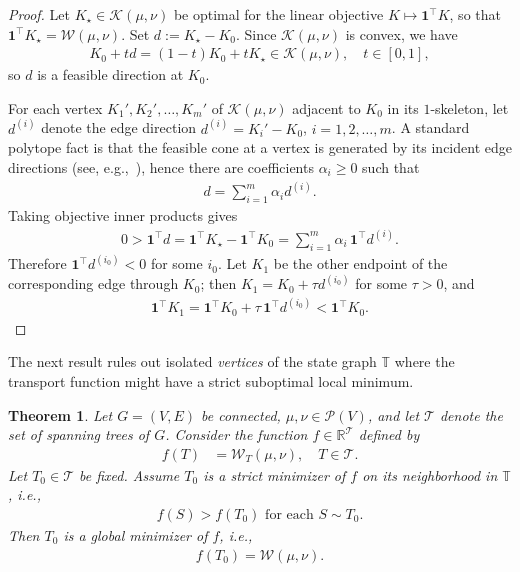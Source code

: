 \documentclass[11pt,a4paper]{article}
\newcommand{\prob}{{\mathscr{P}}}
\newcommand{\wass}{{\mathcal{W}}}
\newcommand{\setoftrees}{{\mathcal{T}}}
\newcommand{\stategraph}{{\mathbb{T}}}
\newcommand{\flowpoly}{{\mathcal{K}}}
\newtheorem{theorem}{Theorem}[section]
\begin{document}
\begin{proof}
    Let $K_\star\in\flowpoly(\mu,\nu)$ be optimal for the linear objective $K\mapsto \mathbf{1}^\top K$, so that $\mathbf{1}^\top K_\star = \wass(\mu,\nu)$. Set $d:=K_\star-K_0$. Since $\flowpoly(\mu,\nu)$ is convex, we have
        \begin{align*}
            K_0+t d = (1-t)K_0+tK_\star \in \flowpoly(\mu,\nu),\quad t\in[0,1],
        \end{align*}
    so $d$ is a feasible direction at $K_0$.

    For each vertex $K_1',K_2',\dotsc, K_m'$ of $\flowpoly(\mu,\nu)$ adjacent to $K_0$ in its $1$-skeleton, let $d^{(i)}$ denote the edge direction $d^{(i)} = K_{i}'-K_0$, $i=1,2,\dotsc, m$. A standard polytope fact is that the feasible cone at a vertex is generated by its incident edge directions (see, e.g.,~\cite{ziegler1995lectures}), hence there are coefficients $\alpha_i\ge 0$ such that
        \begin{align*}
            d = \sum_{i=1}^m \alpha_i d^{(i)}.
        \end{align*}
    Taking objective inner products gives
        \begin{align*}
            0 > \mathbf{1}^\top d = \mathbf{1}^\top K_\star - \mathbf{1}^\top K_0 = \sum_{i=1}^m \alpha_i\,\mathbf{1}^\top d^{(i)}.
        \end{align*}
    Therefore $\mathbf{1}^\top d^{(i_0)}<0$ for some $i_0$. Let $K_1$ be the other endpoint of the corresponding edge through $K_0$; then $K_1 = K_0 + \tau d^{(i_0)}$ for some $\tau>0$, and
        \begin{align*}
            \mathbf{1}^\top K_1 = \mathbf{1}^\top K_0 + \tau\,\mathbf{1}^\top d^{(i_0)} < \mathbf{1}^\top K_0.
        \end{align*}
\end{proof}

The next result rules out isolated \emph{vertices} of the state graph $\stategraph$ where the transport function might have a strict suboptimal local minimum.

\begin{theorem}\label{thm:isolated-vertex-minimizers}
    Let $G=(V,E)$ be connected, $\mu,\nu\in\prob(V)$, and let $\setoftrees$ denote the set of spanning trees of $G$. Consider the function $f\in\mathbb{R}^{\setoftrees}$ defined by
        \begin{align*}
            f(T) &= \wass_T(\mu,\nu), \quad T\in\setoftrees.
        \end{align*}
    Let $T_0\in\setoftrees$ be fixed. Assume $T_0$ is a strict minimizer of $f$ on its neighborhood in $\stategraph$, i.e.,
        \begin{align}\label{eq:strict-local-min}
            f(S) > f(T_0)\text{ for each }S\sim T_0.
        \end{align}
    Then $T_0$ is a global minimizer of $f$, i.e.,
        \begin{align*}
            f(T_0) = \wass(\mu,\nu).
        \end{align*}
\end{theorem}
\end{document}
